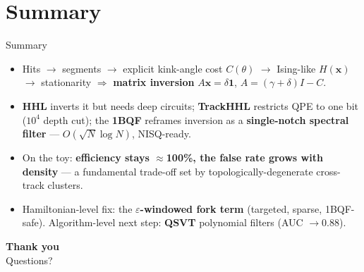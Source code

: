 \section*{Summary}
\begin{frame}{Summary}
  \begin{itemize}
    \item Hits $\to$ segments $\to$ explicit kink-angle cost $C(\theta)$ $\to$ Ising-like $H(\mathbf{x})$ $\to$ stationarity $\Rightarrow$ \textbf{matrix inversion} $A\mathbf{x}=\delta\mathbf{1}$, $A=(\gamma+\delta)I-C$.
    \item \textbf{HHL} inverts it but needs deep circuits; \textbf{TrackHHL} restricts QPE to one bit ($10^4$ depth cut); the \textbf{1BQF} reframes inversion as a \textbf{single-notch spectral filter} --- $O(\sqrt N\log N)$, NISQ-ready.
    \item On the toy: \textbf{efficiency stays $\approx$100\%, the false rate grows with density} --- a fundamental trade-off set by topologically-degenerate cross-track clusters.
    \item Hamiltonian-level fix: the \textbf{$\varepsilon$-windowed fork term} (targeted, sparse, 1BQF-safe). Algorithm-level next step: \textbf{QSVT} polynomial filters (AUC $\to0.88$).
  \end{itemize}
  \vspace{4pt}
  \centering{}
\end{frame}

{
\begin{frame}[plain]\centering\vfill
  {\color{thanksfg}\Large\textbf{Thank you}}\\[4pt]
  {\color{thanksfg!85}\small Questions?}\\[16pt]
  \ThanksLogos
  \vfill
\end{frame}}

\appendix
